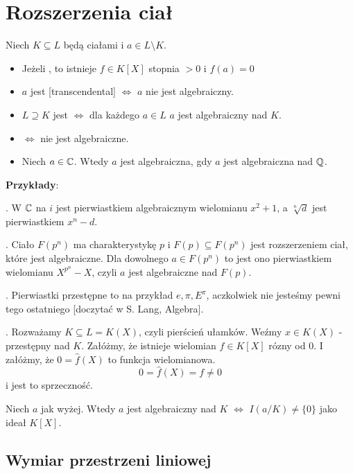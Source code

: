 \section{Rozszerzenia ciał}

\begin{definition}
Niech $K\subseteq L$ będą ciałami i $a\in L\setminus K$.
\begin{itemize}
\item Jeżeli , to istnieje $f\in K[X]$ stopnia $>0$ i $f(a)=0$
\item $a$ jest  [transcendental] $\iff$ $a$ nie jest algebraiczny.
\item {} $L\supseteq K$ jest  $\iff$ dla każdego $a\in L$ $a$ jest algebraiczny nad $K$.
\item {} $\iff$ nie jest algebraiczne.
\item Niech $a\in \mathbb{C}$. Wtedy $a$ jest algebraiczna, gdy $a$ jest algebraiczna nad $\mathbb{Q}$.
\end{itemize}
\end{definition}

\textbf{Przykłady}:

. W $\mathbb{C}$ na $i$ jest pierwiastkiem algebraicznym wielomianu $x^2+1$, a $\sqrt[n]{d}$ jest pierwiastkiem $x^n-d$. 

. Ciało $F(p^n)$ ma charakterystykę $p$ i $F(p)\subseteq F(p^n)$ jest rozszerzeniem ciał, które jest algebraiczne. Dla dowolnego $a\in F(p^n)$ to jest ono pierwiastkiem wielomianu $X^{p^n}-X$, czyli $a$ jest algebraiczne nad $F(p)$.

. Pierwiastki przestępne to na przykład $e,\pi,E^\pi$, aczkolwiek nie jesteśmy pewni tego ostatniego [doczytać w S. Lang, Algebra].

. Rozważamy $K\subseteq L=K(X)$, czyli pierścień ułamków. Weźmy $x\in K(X)$ - przestępny nad $K$. Załóżmy, że istnieje wielomian $f\in K[X]$ rózny od $0$. I załóżmy, że $0=\hat{f}(X)$ to funkcja wielomianowa. 
$$0=\hat{f}(X)=f\neq0$$
i jest to sprzeczność.


\begin{remark}
    Niech $a$ jak wyżej. Wtedy $a$ jest algebraiczny nad $K$ $\iff$ $I(a/K)\neq\{0\}$ jako ideał $K[X]$.
\end{remark}

\subsection{Wymiar przestrzeni liniowej}


